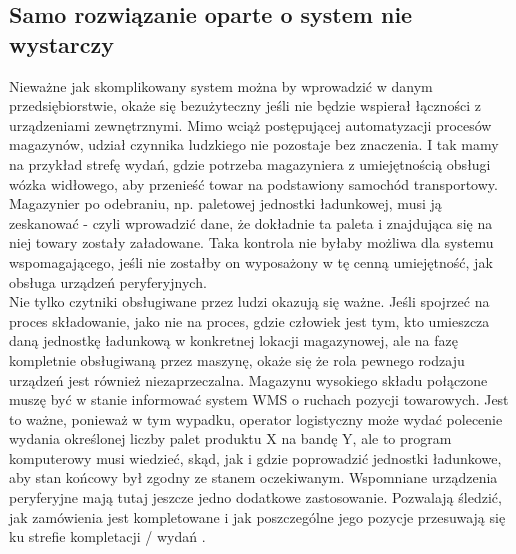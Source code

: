 	\subsection{Samo rozwiązanie oparte o system nie wystarczy}
	Nieważne jak skomplikowany system można by wprowadzić w danym przedsiębiorstwie, okaże się
	bezużyteczny jeśli nie będzie wspierał łączności z urządzeniami zewnętrznymi. Mimo wciąż 
	postępującej automatyzacji procesów magazynów, udział czynnika ludzkiego nie pozostaje bez 
	znaczenia. I tak mamy na przykład strefę wydań, gdzie potrzeba magazyniera z umiejętnością
	obsługi wózka widłowego, aby przenieść towar na podstawiony samochód transportowy. 
	Magazynier po odebraniu, np. paletowej jednostki ładunkowej, musi ją zeskanować - czyli
	wprowadzić dane, że dokładnie ta paleta i znajdująca się na niej towary zostały załadowane.
	Taka kontrola nie byłaby możliwa dla systemu wspomagającego, jeśli nie zostałby on wyposażony
	w tę cenną umiejętność, jak obsługa urządzeń peryferyjnych. \\
	
	Nie tylko czytniki obsługiwane przez ludzi okazują się ważne. Jeśli spojrzeć na proces składowanie,
	jako nie na proces, gdzie człowiek jest tym, kto umieszcza daną jednostkę ładunkową w konkretnej lokacji
	magazynowej, ale na fazę kompletnie obsługiwaną przez maszynę, okaże się że rola pewnego
	rodzaju urządzeń jest również niezaprzeczalna. Magazynu wysokiego składu połączone muszę być w stanie
	informować system WMS o ruchach pozycji towarowych. Jest to ważne, ponieważ w tym wypadku, operator
	logistyczny może wydać polecenie wydania określonej liczby palet produktu X na bandę Y, ale to program
	komputerowy musi wiedzieć, skąd, jak i gdzie poprowadzić jednostki ładunkowe, aby stan
	końcowy był zgodny ze stanem oczekiwanym. Wspomniane urządzenia peryferyjne mają tutaj jeszcze jedno
	dodatkowe zastosowanie. Pozwalają śledzić, jak zamówienia jest kompletowane i jak poszczególne
	jego pozycje przesuwają się ku strefie kompletacji / wydań \cite{LAJ_ZZ_KWMS}.
	

